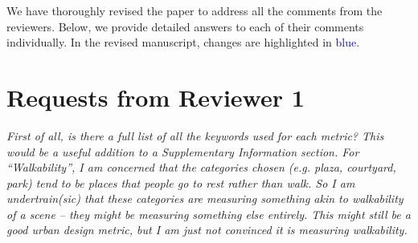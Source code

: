 \documentclass{paper}
\newenvironment{myquote}
{\definecolor{shadecolor}{rgb}{0.9,0.95,1} \begin{shaded*} \sf \em}
{\em\end{shaded*}}
\begin{document}
\noindent We have thoroughly revised the paper to address all the comments from the reviewers. Below, we provide detailed answers to each of their comments individually. In the revised manuscript, changes are highlighted in \textcolor{blue}{blue}.







\section*{Requests from Reviewer 1}
\begin{myquote}
    First of all, is there a full list of all the keywords used for each metric? This would be a useful addition to a Supplementary Information section. For ``Walkability'', I am concerned that the categories chosen (e.g. plaza, courtyard, park) tend to be places that people go to rest rather than walk. So I am undertrain(sic) that these categories are measuring something akin to walkability of a scene – they might be measuring something else entirely. This might still be a good urban design metric, but I am just not convinced it is measuring walkability. 
\end{myquote}
\end{document}
